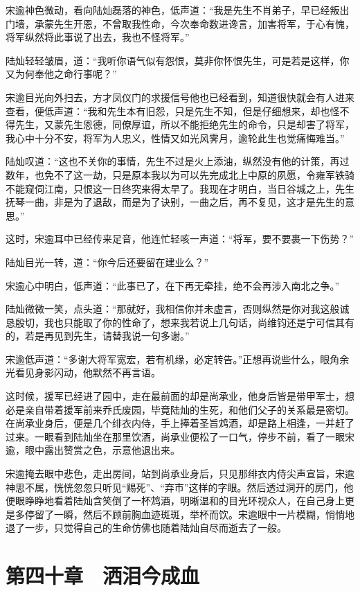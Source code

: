 宋逾神色微动，看向陆灿磊落的神色，低声道：“我是先生不肖弟子，早已经叛出门墙，承蒙先生开恩，不曾取我性命，今次奉命数进谗言，加害将军，于心有愧，将军纵然将此事说了出去，我也不怪将军。”

陆灿轻轻皱眉，道：“我听你语气似有怨恨，莫非你怀恨先生，可是若是这样，你又为何奉他之命行事呢？”

宋逾目光向外扫去，方才凤仪门的求援信号他也已经看到，知道很快就会有人进来查看，便低声道：“我和先生本有旧怨，只是先生不知，但是仔细想来，却也怪不得先生，又蒙先生恩德，同僚厚谊，所以不能拒绝先生的命令，只是却害了将军，我心中十分不安，将军为人忠义，性情又如光风霁月，逾轮此生也觉痛悔难当。”

陆灿叹道：“这也不关你的事情，先生不过是火上添油，纵然没有他的计策，再过数年，也免不了这一劫，只是原本我以为可以先完成北上中原的夙愿，令雍军铁骑不能窥伺江南，只恨这一日终究来得太早了。我现在才明白，当日谷城之上，先生抚琴一曲，非是为了退敌，而是为了诀别，一曲之后，再不复见，这才是先生的意思。”

这时，宋逾耳中已经传来足音，他连忙轻咳一声道：“将军，要不要裹一下伤势？”

陆灿目光一转，道：“你今后还要留在建业么？”

宋逾心中明白，低声道：“此事已了，在下再无牵挂，绝不会再涉入南北之争。”

陆灿微微一笑，点头道：“那就好，我相信你并未虚言，否则纵然是你对我这般诚恳殷切，我也只能取了你的性命了，想来我若说上几句话，尚维钧还是宁可信其有的，若是再见到先生，请替我说一句多谢。”

宋逾低声道：“多谢大将军宽宏，若有机缘，必定转告。”正想再说些什么，眼角余光看见身影闪动，他默然不再言语。

这时候，援军已经进了园中，走在最前面的却是尚承业，他身后皆是带甲军士，想必是亲自带着援军前来乔氏废园，毕竟陆灿的生死，和他们父子的关系最是密切。在尚承业身后，便是几个绯衣内侍，手上捧着圣旨鸩酒，却是路上相逢，一并赶了过来。一眼看到陆灿坐在那里饮酒，尚承业便松了一口气，停步不前，看了一眼宋逾，眼中露出赞赏之色，示意他退出来。

宋逾掩去眼中悲色，走出房间，站到尚承业身后，只见那绯衣内侍尖声宣旨，宋逾神思不属，恍恍忽忽只听见“赐死”、“弃市”这样的字眼。然后透过洞开的房门，他便眼睁睁地看着陆灿含笑倒了一杯鸩酒，明晰温和的目光环视众人，在自己身上更是多停留了一瞬，然后不顾前胸血迹斑斑，举杯而饮。宋逾眼中一片模糊，悄悄地退了一步，只觉得自己的生命仿佛也随着陆灿自尽而逝去了一般。

\chapter{第四十章　洒泪今成血}

